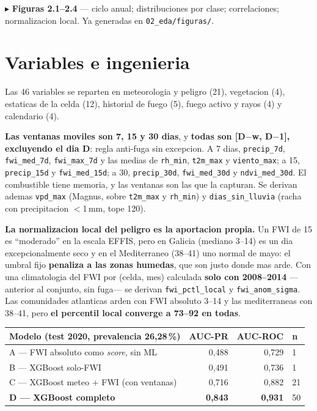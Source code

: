 \documentclass[10pt,a4paper]{article}
\newcommand{\var}[1]{\texttt{\footnotesize #1}}
\newcommand{\fig}[2]{{\color{blue}\footnotesize$\blacktriangleright$ \textbf{#1} --- #2\par}}
\begin{document}
\fig{Figuras 2.1--2.4}{ciclo anual; distribuciones por clase; correlaciones; normalizacion local.
Ya generadas en \var{02\_eda/figuras/}.}

\section{Variables e ingenieria}

Las 46 variables se reparten en meteorologia y peligro (21), vegetacion (4), estaticas de la celda
(12), historial de fuego (5), fuego activo y rayos (4) y calendario (4).

\textbf{Las ventanas moviles son 7, 15 y 30 dias}, y \textbf{todas son [D$-$w, D$-$1], excluyendo
el dia D}: regla anti-fuga sin excepcion. A 7 dias, \var{precip\_7d}, \var{fwi\_med\_7d},
\var{fwi\_max\_7d} y las medias de \var{rh\_min}, \var{t2m\_max} y \var{viento\_max}; a 15,
\var{precip\_15d} y \var{fwi\_med\_15d}; a 30, \var{precip\_30d}, \var{fwi\_med\_30d} y
\var{ndvi\_med\_30d}. El combustible tiene memoria, y las ventanas son las que la capturan. Se
derivan ademas \var{vpd\_max} (Magnus, sobre \var{t2m\_max} y \var{rh\_min}) y
\var{dias\_sin\_lluvia} (racha con precipitacion $<$1\,mm, tope 120).

\textbf{La normalizacion local del peligro es la aportacion propia.} Un FWI de 15 es ``moderado''
en la escala EFFIS, pero en Galicia (mediano 3--14) es un dia excepcionalmente seco y en el
Mediterraneo (38--41) uno normal de mayo: el umbral fijo \textbf{penaliza a las zonas humedas},
que son justo donde mas arde. Con una climatologia del FWI por (celda, mes) calculada
\textbf{solo con 2008--2014} ---anterior al conjunto, sin fuga--- se derivan
\var{fwi\_pctl\_local} y \var{fwi\_anom\_sigma}. Las comunidades atlanticas arden con FWI absoluto
3--14 y las mediterraneas con 38--41, pero \textbf{el percentil local converge a 73--92 en todas}.

\begin{center}\footnotesize
\begin{tabular}{@{}lrrl@{}}
\toprule
\textbf{Modelo (test 2020, prevalencia 26,28\,\%)} & \textbf{AUC-PR} & \textbf{AUC-ROC} & \textbf{n} \\
\midrule
A --- FWI absoluto como \emph{score}, sin ML & 0,488 & 0,729 & 1 \\
B --- XGBoost solo-FWI & 0,491 & 0,736 & 1 \\
C --- XGBoost meteo $+$ FWI (con ventanas) & 0,716 & 0,882 & 21 \\
\textbf{D --- XGBoost completo} & \textbf{0,843} & \textbf{0,931} & 50 \\
\bottomrule
\end{tabular}
\end{center}
\end{document}
